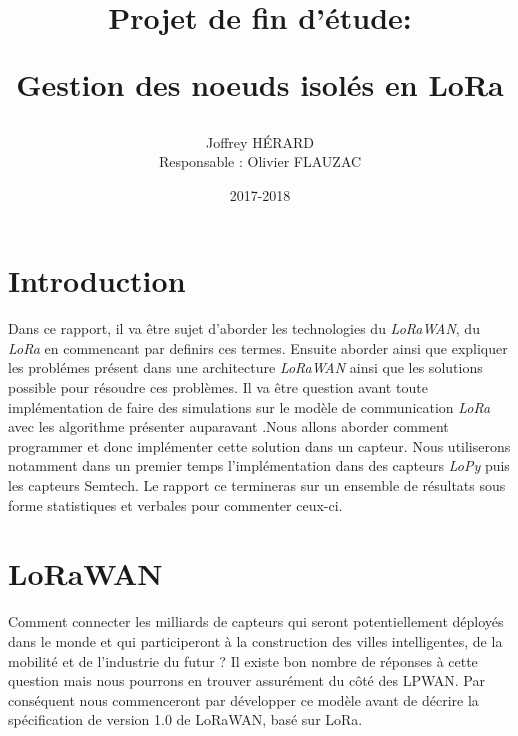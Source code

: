 \documentclass[11pt]{article}
\begin{document}
 \makeatletter
\def\maketitle{%
  \null
  \thispagestyle{empty}%
   \vfill
  \begin{center}\leavevmode
    \normalfont
    {\Huge \@title\par}%
    \vskip 3cm
    {\Large \@author\par}%
    \vskip 1cm
    {\Large \@date\par}%
  \end{center}%
  \vfill
  \null
  \cleardoublepage
  }
\makeatother
\title{\begin{center}Projet de fin d'étude:\end{center} Gestion des noeuds isolés en LoRa }
\author{ Joffrey HÉRARD 
\begin{center}Responsable : Olivier FLAUZAC\end{center}}
\date{2017-2018}
\maketitle 
 
\tableofcontents 

\setlength{\parskip}{0.5em}
\newpage
\section{Introduction}
Dans ce rapport, il va être sujet d'aborder les technologies du \textit{LoRaWAN}, du\textit{ LoRa} en commencant par definirs ces termes. Ensuite aborder ainsi que expliquer les problémes présent dans une architecture \textit{LoRaWAN} ainsi que les solutions possible pour résoudre ces problèmes. Il va être question avant toute implémentation de faire des simulations sur le modèle de communication \textit{LoRa} avec les algorithme présenter auparavant .Nous allons aborder comment programmer et donc implémenter cette solution dans un capteur. Nous utiliserons notamment dans un premier temps l'implémentation dans des capteurs \textit{LoPy} puis les capteurs Semtech. Le rapport ce termineras sur un ensemble de résultats sous forme statistiques et verbales pour commenter ceux-ci.  
\newpage
\section{LoRaWAN}
Comment connecter les milliards de capteurs qui seront potentiellement déployés dans le monde et qui participeront à la construction des villes intelligentes, de la mobilité et de l'industrie du futur ? \newline
Il existe bon nombre de réponses à cette question mais nous pourrons en trouver assurément du côté des LPWAN. Par conséquent nous commenceront par développer ce modèle avant de décrire la spécification de version 1.0 de LoRaWAN, basé sur LoRa.
\end{document}
